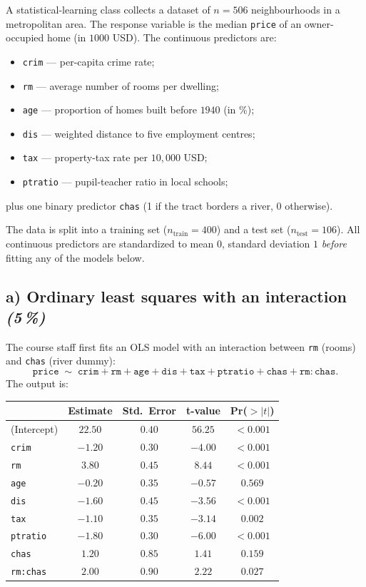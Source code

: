\documentclass[11pt,a4paper]{article}
\newcommand{\subpoints}[1]{\textit{(#1\,\%)}}
\begin{document}
A statistical-learning class collects a dataset of $n = 506$ neighbourhoods in a metropolitan area. The response variable is the median \texttt{price} of an owner-occupied home (in $1000$ USD). The continuous predictors are:
\begin{itemize}
  \item \texttt{crim} --- per-capita crime rate;
  \item \texttt{rm} --- average number of rooms per dwelling;
  \item \texttt{age} --- proportion of homes built before $1940$ (in \%);
  \item \texttt{dis} --- weighted distance to five employment centres;
  \item \texttt{tax} --- property-tax rate per $10{,}000$ USD;
  \item \texttt{ptratio} --- pupil-teacher ratio in local schools;
\end{itemize}
plus one binary predictor \texttt{chas} (1 if the tract borders a river, 0 otherwise).

The data is split into a training set ($n_\text{train} = 400$) and a test set ($n_\text{test} = 106$). All continuous predictors are standardized to mean $0$, standard deviation $1$ \emph{before} fitting any of the models below.

\subsection*{a) Ordinary least squares with an interaction \subpoints{5}}

The course staff first fits an OLS model with an interaction between \texttt{rm} (rooms) and \texttt{chas} (river dummy):
$$\texttt{price} \;\sim\; \texttt{crim} + \texttt{rm} + \texttt{age} + \texttt{dis} + \texttt{tax} + \texttt{ptratio} + \texttt{chas} + \texttt{rm}\!:\!\texttt{chas}.$$
The output is:

\begin{center}\small
\begin{tabular}{lcccc}
\toprule
 & \textbf{Estimate} & \textbf{Std.\ Error} & \textbf{t-value} & \textbf{Pr($>|t|$)} \\
\midrule
(Intercept)         & $22.50$  & $0.40$   & $56.25$ & $<0.001$ \\
\texttt{crim}       & $-1.20$  & $0.30$   & $-4.00$ & $<0.001$ \\
\texttt{rm}         & $3.80$   & $0.45$   & $8.44$  & $<0.001$ \\
\texttt{age}        & $-0.20$  & $0.35$   & $-0.57$ & $0.569$  \\
\texttt{dis}        & $-1.60$  & $0.45$   & $-3.56$ & $<0.001$ \\
\texttt{tax}        & $-1.10$  & $0.35$   & $-3.14$ & $0.002$  \\
\texttt{ptratio}    & $-1.80$  & $0.30$   & $-6.00$ & $<0.001$ \\
\texttt{chas}       & $1.20$   & $0.85$   & $1.41$  & $0.159$  \\
\texttt{rm:chas}    & $2.00$   & $0.90$   & $2.22$  & $0.027$  \\
\bottomrule
\end{tabular}
\end{center}
\end{document}
